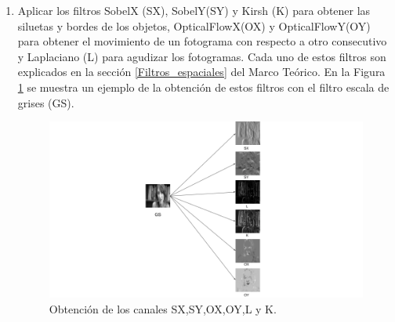 \begin{onehalfspacing}
\begin{enumerate}
    \item Aplicar los filtros SobelX (SX), SobelY(SY) y Kirsh (K) para obtener las siluetas y bordes de los objetos, OpticalFlowX(OX) y OpticalFlowY(OY) para obtener el movimiento de un fotograma con respecto a otro consecutivo y Laplaciano (L) para agudizar los fotogramas. Cada uno de estos filtros son explicados en la sección \ref{Filtros_espaciales} del Marco Teórico. En la Figura \ref{fig:Fig_Dataset1_Filtros} se muestra un ejemplo de la obtención de estos filtros con el filtro escala de grises (GS).
    \begin{figure}[h!]
    	\centering
    	\includegraphics[width=18cm,keepaspectratio]{XX_Figures/Fig_Dataset1_Filtros.png}
    	\caption{\footnotesize Obtención de los canales SX,SY,OX,OY,L y K.}
    	\label{fig:Fig_Dataset1_Filtros}
    \end{figure}
    

\end{enumerate}
\end{onehalfspacing}
